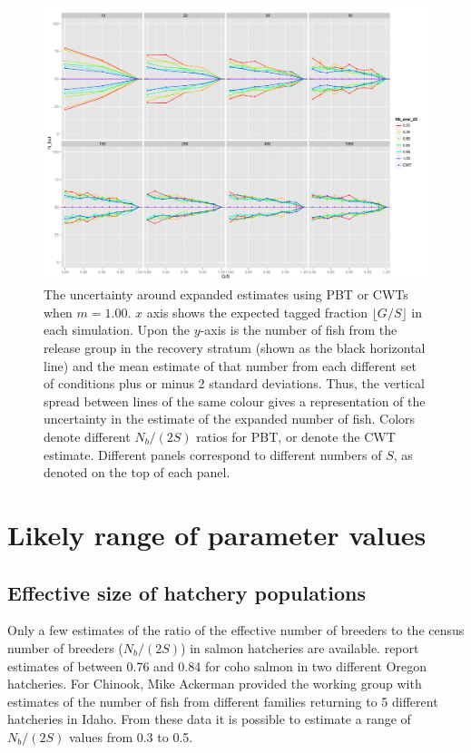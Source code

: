\documentclass[11pt]{article}
\begin{document}
\begin{figure}
\includegraphics[width = .93\textwidth]{./images/sd_line_horns_m_1.pdf}
\caption{The uncertainty around expanded estimates using PBT or CWTs when $m = 1.00$.  $x$ axis shows the
expected tagged fraction $\lfloor G/S \rfloor$ in each simulation. Upon the $y$-axis is the number of fish from the
release group in the recovery stratum (shown as the black horizontal line) and the mean estimate of that number from each different set of 
conditions plus or minus 2 standard deviations.  Thus, the vertical spread between lines of the same colour gives a representation
of the uncertainty in the estimate of the expanded number of fish. Colors denote different $N_b/(2S)$ ratios for PBT, or denote
the CWT estimate.  Different
panels correspond to different numbers of $S$, as denoted on the top of each panel.
\label{fig:horn1.0}}
\end{figure}



\section{Likely range of parameter values}

\subsection{Effective size of hatchery populations}

Only a few estimates of the ratio of the effective number of breeders to the census number of breeders ($N_b/(2S)$) in salmon
hatcheries are available.  \citet{Moyeretal2007} report estimates of between 0.76 and 0.84 for coho salmon in two different 
Oregon hatcheries.  For Chinook, Mike Ackerman provided the working group with estimates of the number of fish from different
families returning to 5 different
hatcheries in Idaho.  From these data it is possible to estimate a range of $N_b/(2S)$ values from 0.3 to 0.5.
\end{document}
